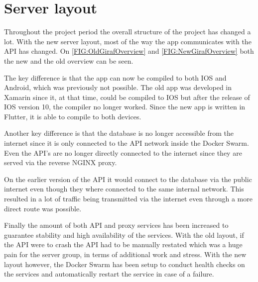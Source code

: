\section{Server layout}

Throughout the project period the overall structure of the project has changed a lot. 
With the new server layout, most of the way the app communicates with the API has changed. 
On \autoref{FIG:OldGirafOverview} and \autoref{FIG:NewGirafOverview} both the new and the old overview can be seen. 

The key difference is that the app can now be compiled to both IOS and Android, which was previously not possible. 
The old app was developed in Xamarin since it, at that time, could be compiled to IOS but after the release of IOS version 10, the compiler no longer worked. 
Since the new app is written in Flutter, it is able to compile to both devices. 


Another key difference is that the database is no longer accessible from the internet since it is only connected to the API network inside the Docker Swarm. 
Even the API's are no longer directly connected to the internet since they are served via the reverse NGINX proxy.

On the earlier version of the API it would connect to the database via the public internet even though they where connected to the same internal network.
This resulted in a lot of traffic being transmitted via the internet even through a more direct route was possible. 


Finally the amount of both API and proxy services has been increased to guarantee stability and high availability of the services. 
With the old layout, if the API were to crash the API had to be manually restated which was a huge pain for the server group, in terms of additional work and stress. 
With the new layout however, the Docker Swarm has been setup to conduct health checks on the services and automatically restart the service in case of a failure.
